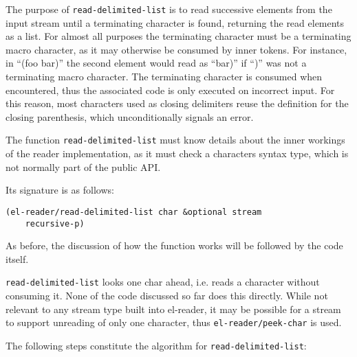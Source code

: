 \documentclass[a4paper,10pt,twoside]{report}
\newcommand{\elr}{el-reader}
\newcommand{\fun}[1]{\texttt{#1}}
\begin{document}
The purpose of \fun{read-delimited-list} is to read successive elements from the
input stream until a terminating character is found, returning the read elements
as a list.  For almost all purposes the terminating character must be a
terminating macro character, as it may otherwise be consumed by inner tokens.
For instance, in ``(foo bar)'' the second element would read as ``bar)'' if
``)'' was not a terminating macro character.  The terminating character is
consumed when encountered, thus the associated code is only executed on
incorrect input.  For this reason, most characters used as closing delimiters
reuse the definition for the closing parenthesis, which unconditionally signals
an error.

The function \fun{read-delimited-list} must know details about the inner
workings of the reader implementation, as it must check a characters syntax
type, which is not normally part of the public API.

Its signature is as follows:

\begin{lstlisting}[style=lispinline]
  (el-reader/read-delimited-list char &optional stream
    recursive-p)
\end{lstlisting}

As before, the discussion of how the function works will be followed by the code
itself.

\fun{read-delimited-list} looks one char ahead, i.e. reads a character without
consuming it.  None of the code discussed so far does this directly.  While not
relevant to any stream type built into \elr{}, it may be possible for a stream
to support unreading of only one character, thus \fun{el-reader/peek-char} is
used.

The following steps constitute the algorithm for \fun{read-delimited-list}:
\end{document}
